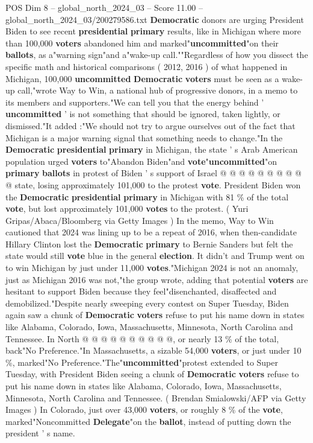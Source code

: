 \begin{textsample}{POS Dim 8 – global\_north\_2024\_03 – Score 11.00 – global\_north\_2024\_03/200279586.txt}  \label{ex:f8_pos_014}
\textbf{Democratic} donors are urging President Biden to see recent \textbf{presidential} \textbf{primary} results, like in Michigan where more than 100,000 \textbf{voters} abandoned him and marked"\textbf{uncommitted}"on their \textbf{ballots}, as a"warning sign"and a"wake-up call.""Regardless of how you dissect the specific math and historical comparisons ( 2012, 2016 ) of what happened in Michigan, 100,000 \textbf{uncommitted} \textbf{Democratic} \textbf{voters} must be seen as a wake-up call,"wrote Way to Win, a national hub of progressive donors, in a memo to its members and supporters."We can tell you that the energy behind ' \textbf{uncommitted} ' is not something that should be ignored, taken lightly, or dismissed."It added :"We should not try to argue ourselves out of the fact that Michigan is a major warning signal that something needs to change."In the \textbf{Democratic} \textbf{presidential} \textbf{primary} in Michigan, the state ' s Arab American population urged \textbf{voters} to"Abandon Biden"and \textbf{vote}"\textbf{uncommitted}"on \textbf{primary} \textbf{ballots} in protest of Biden ' s support of Israel @ @ @ @ @ @ @ @ @ @ state, losing approximately 101,000 to the protest \textbf{vote}.
President Biden won the \textbf{Democratic} \textbf{presidential} \textbf{primary} in Michigan with 81 \% of the total \textbf{vote}, but lost approximately 101,000 \textbf{votes} to the protest. ( Yuri Gripas/Abaca/Bloomberg via Getty Images ) In the memo, Way to Win cautioned that 2024 was lining up to be a repeat of 2016, when then-candidate Hillary Clinton lost the \textbf{Democratic} \textbf{primary} to Bernie Sanders but felt the state would still \textbf{vote} blue in the general \textbf{election}.
It didn't and Trump went on to win Michigan by just under 11,000 \textbf{votes}."Michigan 2024 is not an anomaly, just as Michigan 2016 was not,"the group wrote, adding that potential \textbf{voters} are hesitant to support Biden because they feel"disenchanted, disaffected and demobilized."Despite nearly sweeping every contest on Super Tuesday, Biden again saw a chunk of \textbf{Democratic} \textbf{voters} refuse to put his name down in states like Alabama, Colorado, Iowa, Massachusetts, Minnesota, North Carolina and Tennessee.
In North @ @ @ @ @ @ @ @ @ @, or nearly 13 \% of the total, back"No Preference."In Massachusetts, a sizable 54,000 \textbf{voters}, or just under 10 \%, marked"No Preference."The"\textbf{uncommitted}"protest extended to Super Tuesday, with President Biden seeing a chunk of \textbf{Democratic} \textbf{voters} refuse to put his name down in states like Alabama, Colorado, Iowa, Massachusetts, Minnesota, North Carolina and Tennessee. ( Brendan Smialowski/AFP via Getty Images ) In Colorado, just over 43,000 \textbf{voters}, or roughly 8 \% of the \textbf{vote}, marked"Noncommitted \textbf{Delegate}"on the \textbf{ballot}, instead of putting down the president ' s name.

\end{textsample}
